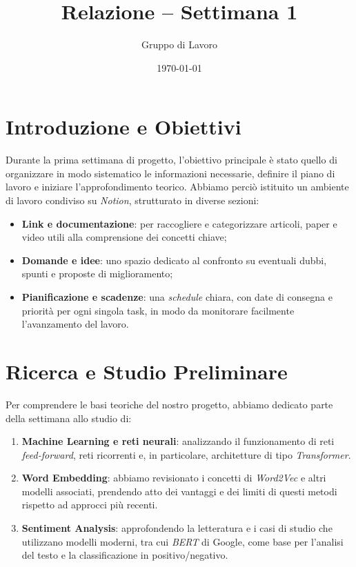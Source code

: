 \documentclass[a4paper,12pt]{article}
\title{Relazione -- Settimana 1}
\author{Gruppo di Lavoro}
\date{\today}
\begin{document}
\maketitle

\section*{Introduzione e Obiettivi}
Durante la prima settimana di progetto, l'obiettivo principale è stato quello di organizzare in modo sistematico le informazioni necessarie, definire il piano di lavoro e iniziare l'approfondimento teorico. Abbiamo perciò istituito un ambiente di lavoro condiviso su \emph{Notion}, strutturato in diverse sezioni:
\begin{itemize}
    \item \textbf{Link e documentazione}: per raccogliere e categorizzare articoli, paper e video utili alla comprensione dei concetti chiave;
    \item \textbf{Domande e idee}: uno spazio dedicato al confronto su eventuali dubbi, spunti e proposte di miglioramento;
    \item \textbf{Pianificazione e scadenze}: una \emph{schedule} chiara, con date di consegna e priorità per ogni singola task, in modo da monitorare facilmente l’avanzamento del lavoro.
\end{itemize}

\section*{Ricerca e Studio Preliminare}
Per comprendere le basi teoriche del nostro progetto, abbiamo dedicato parte della settimana allo studio di:
\begin{enumerate}
    \item \textbf{Machine Learning e reti neurali}: analizzando il funzionamento di reti \emph{feed-forward}, reti ricorrenti e, in particolare, architetture di tipo \emph{Transformer}.
    \item \textbf{Word Embedding}: abbiamo revisionato i concetti di \emph{Word2Vec} e altri modelli associati, prendendo atto dei vantaggi e dei limiti di questi metodi rispetto ad approcci più recenti.
    \item \textbf{Sentiment Analysis}: approfondendo la letteratura e i casi di studio che utilizzano modelli moderni, tra cui \emph{BERT} di Google, come base per l'analisi del testo e la classificazione in positivo/negativo.
\end{enumerate}
\end{document}
